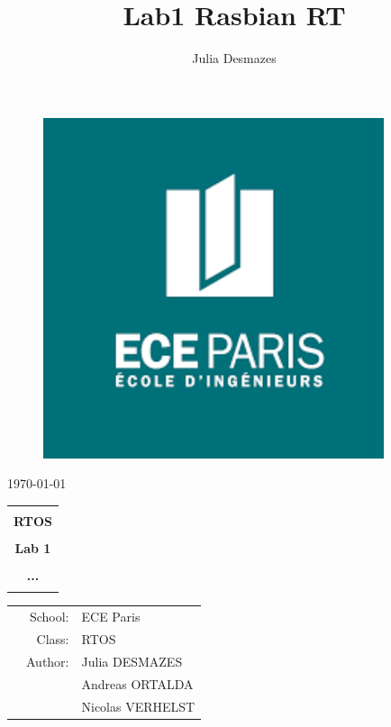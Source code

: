 \documentclass[10pt,a4paper]{article}
\author{Julia Desmazes}
\title{Lab1 Rasbian RT}
\begin{document}
\begin{titlepage}

\begin{figure}[h!]
\begin{center}
\includegraphics[width=10cm]{ECE.png}
\end{center}
\end{figure}

\begin{center}
\today
\end{center}

\vspace{1cm}


\begin{center}
\begin{tabular}{c}
\hline
    \vspace{0.2cm}\\
    \textbf{{\Large RTOS}}\\
\\
\textbf{{\Huge Lab 1}}\\
\\
    \textbf{{\LARGE ...}}\\
\\
\hline
\end{tabular}
\end{center}

\vspace{3cm}

\begin{table}[h]
\begin{tabular}{rrl}
\hspace{5 cm} & School: & ECE Paris\\
& Class: & RTOS\\
& Author: & Julia DESMAZES \\
& & Andreas ORTALDA\\
& & Nicolas VERHELST \\
\end{tabular}
\end{table}

\end{titlepage}
\end{document}

